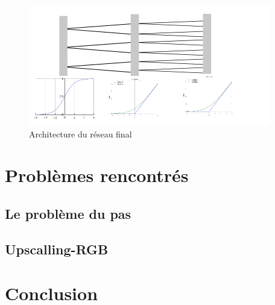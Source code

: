 \documentclass[12pt, a4paper]{article}
\begin{document}
\begin{figure}[h!]
  \centering
  \includegraphics[scale=1]{Images/architecture.png}
  \caption{Architecture du réseau final}
\end{figure}

\section{Problèmes rencontrés}
	\subsection{Le problème du pas}
	\subsection{Upscalling-RGB}

\section*{Conclusion}
\end{document}
